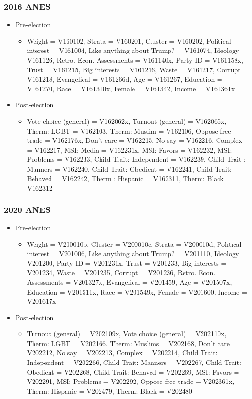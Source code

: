 \subsubsection{2016 ANES}
\begin{itemize}
	\item Pre-election
	\begin{itemize}
		\item Weight = V160102, Strata = V160201, Cluster = V160202, Political interest = V161004, Like anything about Trump? = V161074, Ideology = V161126, Retro. Econ. Assessments = V161140x, Party ID = V161158x, Trust = V161215, Big interests = V161216, Waste = V161217, Corrupt = V161218, Evangelical = V161266d, Age = V161267, Education = V161270, Race = V161310x, Female = V161342, Income = V161361x
	\end{itemize}
	\item Post-election
	\begin{itemize}
		\item Vote choice (general) = V162062x, Turnout (general) = V162065x, Therm: LGBT = V162103, Therm: Muslim = V162106, Oppose free trade = V162176x, Don't care = V162215, No say = V162216, Complex = V162217, MSI: Media = V162231x, MSI: Favors = V162232, MSI: Problems = V162233, Child Trait: Independent = V162239, Child Trait : Manners = V162240, Child Trait: Obedient = V162241, Child Trait: Behaved = V162242, Therm : Hispanic = V162311, Therm: Black = V162312
	\end{itemize}
\end{itemize}


\subsubsection{2020 ANES}
\begin{itemize}
	\item Pre-election
	\begin{itemize}
		\item Weight = V200010b, Cluster = V200010c, Strata = V200010d, Political interest = V201006, Like anything about Trump? = V201110, Ideology = V201200, Party ID = V201231x, Trust = V201233, Big interests = V201234, Waste = V201235, Corrupt = V201236, Retro. Econ. Assessments = V201327x, Evangelical = V201459, Age = V201507x, Education = V201511x, Race = V201549x, Female = V201600, Income = V201617x
	\end{itemize}
	\item Post-election
	\begin{itemize}
		\item Turnout (general) = V202109x, Vote choice (general) = V202110x, Therm: LGBT = V202166, Therm: Muslims = V202168, Don't care = V202212, No say = V202213, Complex = V202214, Child Trait: Independent = V202266, Child Trait: Manners = V202267, Child Trait: Obedient = V202268, Child Trait: Behaved = V202269, MSI: Favors = V202291, MSI: Problems = V202292, Oppose free trade = V202361x, Therm: Hispanic = V202479, Therm: Black = V202480
	\end{itemize}
\end{itemize}

\doublespacing